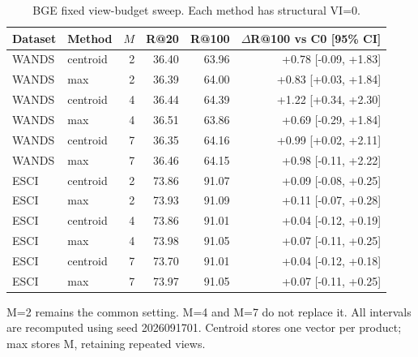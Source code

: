 \begin{table}[t]
\centering
\small
\setlength{\tabcolsep}{4pt}
\caption{BGE fixed view-budget sweep. Each method has structural VI=0.}
\label{tab:bge_budget}
\begin{tabular}{llrrrr}
\toprule
Dataset & Method & $M$ & R@20 & R@100 & $\Delta$R@100 vs C0 [95\% CI] \\
\midrule
WANDS & centroid & 2 & 36.40 & 63.96 & +0.78 [-0.09, +1.83] \\
WANDS & max & 2 & 36.39 & 64.00 & +0.83 [+0.03, +1.84] \\
WANDS & centroid & 4 & 36.44 & 64.39 & +1.22 [+0.34, +2.30] \\
WANDS & max & 4 & 36.51 & 63.86 & +0.69 [-0.29, +1.84] \\
WANDS & centroid & 7 & 36.35 & 64.16 & +0.99 [+0.02, +2.11] \\
WANDS & max & 7 & 36.46 & 64.15 & +0.98 [-0.11, +2.22] \\
ESCI & centroid & 2 & 73.86 & 91.07 & +0.09 [-0.08, +0.25] \\
ESCI & max & 2 & 73.93 & 91.09 & +0.11 [-0.07, +0.28] \\
ESCI & centroid & 4 & 73.86 & 91.01 & +0.04 [-0.12, +0.19] \\
ESCI & max & 4 & 73.98 & 91.05 & +0.07 [-0.11, +0.25] \\
ESCI & centroid & 7 & 73.70 & 91.01 & +0.04 [-0.12, +0.18] \\
ESCI & max & 7 & 73.97 & 91.05 & +0.07 [-0.11, +0.25] \\
\bottomrule
\end{tabular}
\par\smallskip\begin{minipage}{\linewidth}\small M=2 remains the common setting. M=4 and M=7 do not replace it. All intervals are recomputed using seed 2026091701. Centroid stores one vector per product; max stores M, retaining repeated views.\end{minipage}
\end{table}
